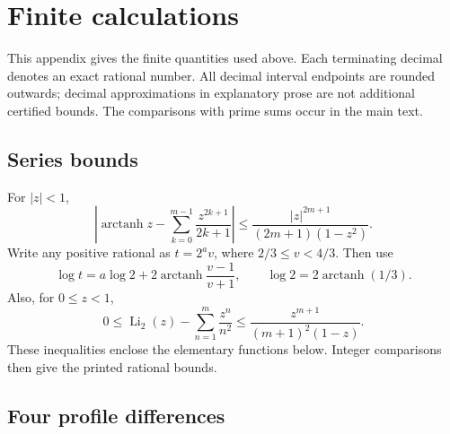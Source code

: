 \section{Finite calculations}\label{app:finite-calculations}

This appendix gives the finite quantities used above.
Each terminating decimal denotes an exact rational number.
All decimal interval endpoints are rounded outwards; decimal approximations
in explanatory prose are not additional certified bounds.
The comparisons with prime sums occur in the main text.

\subsection{Series bounds}

For \(|z|<1\),
\begin{equation}\label{eq:app-log-tail}
 \left|\operatorname{arctanh}z-
 \sum_{k=0}^{m-1}\frac{z^{2k+1}}{2k+1}\right|
 \le\frac{|z|^{2m+1}}{(2m+1)(1-z^2)}.
\end{equation}
Write any positive rational as \(t=2^a v\),
where \(2/3\le v<4/3\).
Then use
\begin{equation}\label{eq:app-log-reduction}
 \log t=a\log2+2\operatorname{arctanh}\frac{v-1}{v+1},
 \qquad \log2=2\operatorname{arctanh}(1/3).
\end{equation}
Also, for \(0\le z<1\),
\begin{equation}\label{eq:app-dilog-tail}
 0\le\operatorname{Li}_2(z)-\sum_{n=1}^m\frac{z^n}{n^2}
 \le\frac{z^{m+1}}{(m+1)^2(1-z)}.
\end{equation}
These inequalities enclose the elementary functions below.
Integer comparisons then give the printed rational bounds.

\subsection{Four profile differences}\label{subsec:app-h6-four-profiles}

